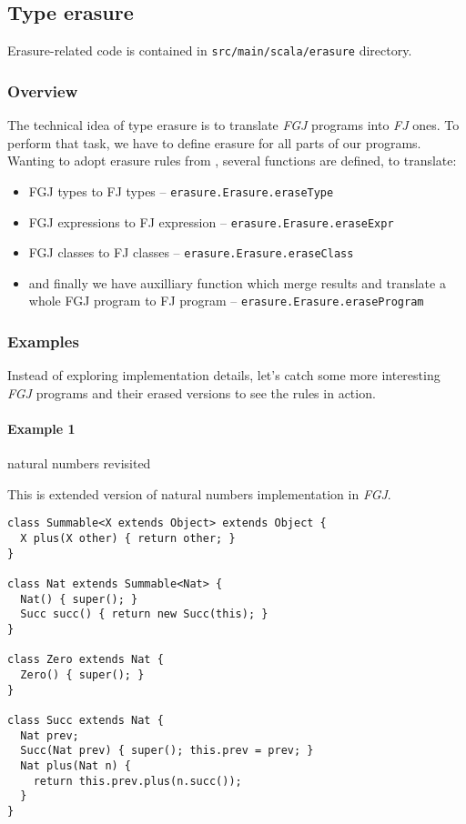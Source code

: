 \documentclass{article}[12pt]
\begin{document}
\subsection{Type erasure}

Erasure-related code is contained in \texttt{src/main/scala/erasure} directory.

\subsubsection{Overview}

The technical idea of type erasure is to translate \emph{FGJ} programs into \emph{FJ} ones. To perform that task, we have to define erasure for all parts of our programs. Wanting to adopt erasure rules from \cite{fj}, several functions are defined, to translate:

\begin{itemize}
\item FGJ types to FJ types -- \texttt{erasure.Erasure.eraseType}
\item FGJ expressions to FJ expression -- \texttt{erasure.Erasure.eraseExpr}
\item FGJ classes to FJ classes -- \texttt{erasure.Erasure.eraseClass}
\item and finally we have auxilliary function which merge results and translate a whole FGJ program to FJ program -- \texttt{erasure.Erasure.eraseProgram}
\end{itemize}

\subsubsection{Examples}

Instead of exploring implementation details, let's catch some more interesting \emph{FGJ} programs and their erased versions to see the rules in action.

\paragraph{Example 1} natural numbers revisited

This is extended version of natural numbers implementation in \emph{FGJ}.

\begin{verbatim}
class Summable<X extends Object> extends Object {
  X plus(X other) { return other; }
}

class Nat extends Summable<Nat> {
  Nat() { super(); }
  Succ succ() { return new Succ(this); }
}

class Zero extends Nat { 
  Zero() { super(); }
}

class Succ extends Nat {
  Nat prev;
  Succ(Nat prev) { super(); this.prev = prev; }
  Nat plus(Nat n) {
    return this.prev.plus(n.succ());
  }
}
\end{verbatim}
\end{document}

